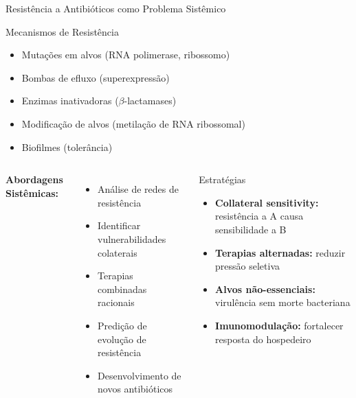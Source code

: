 \begin{frame}{Resistência a Antibióticos como Problema Sistêmico}
\begin{block}{Mecanismos de Resistência}
\begin{itemize}
    \item Mutações em alvos (RNA polimerase, ribossomo)
    \item Bombas de efluxo (superexpressão)
    \item Enzimas inativadoras ($\beta$-lactamases)
    \item Modificação de alvos (metilação de RNA ribossomal)
    \item Biofilmes (tolerância)
\end{itemize}
\end{block}

\vspace{0.3cm}

\begin{columns}
\textbf{Abordagens Sistêmicas:}
\begin{itemize}
    \item Análise de redes de resistência
    \item Identificar vulnerabilidades colaterais
    \item Terapias combinadas racionais
    \item Predição de evolução de resistência
    \item Desenvolvimento de novos antibióticos
\end{itemize}

\begin{alertblock}{Estratégias}
\begin{itemize}
    \item \textbf{Collateral sensitivity:} resistência a A causa sensibilidade a B
    \item \textbf{Terapias alternadas:} reduzir pressão seletiva
    \item \textbf{Alvos não-essenciais:} virulência sem morte bacteriana
    \item \textbf{Imunomodulação:} fortalecer resposta do hospedeiro
\end{itemize}
\end{alertblock}
\end{columns}

\end{frame}

